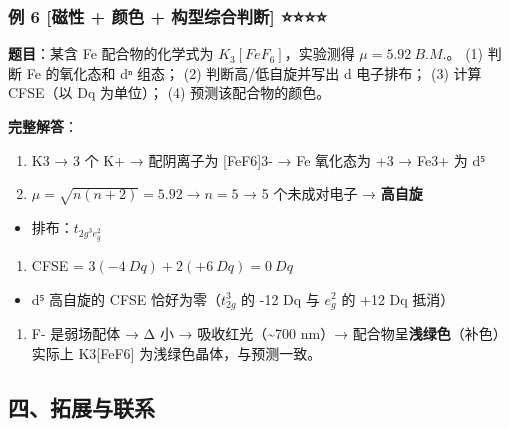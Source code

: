 \documentclass[a4paper,11pt]{ctexart}
\providecommand{\tightlist}{\setlength{\itemsep}{0pt}\setlength{\parskip}{0pt}}
\begin{document}
\subsubsection{例 6 {[}磁性 + 颜色 + 构型综合判断{]} ⭐⭐⭐⭐}\label{ux4f8b-6-ux78c1ux6027-ux989cux8272-ux6784ux578bux7efcux5408ux5224ux65ad}

\textbf{题目}：某含 Fe 配合物的化学式为 \(K_3[FeF_6]\)，实验测得 \(\mu = 5.92\ B.M.\)。
(1) 判断 Fe 的氧化态和 dⁿ 组态；
(2) 判断高/低自旋并写出 d 电子排布；
(3) 计算 CFSE（以 Dq 为单位）；
(4) 预测该配合物的颜色。

\textbf{完整解答}：

\begin{enumerate}
\def\labelenumi{(\arabic{enumi})}
\item
  K3 → 3 个 K+ → 配阴离子为 {[}FeF6{]}3- → Fe 氧化态为 +3 → Fe3+ 为 d⁵
\item
  \(\mu = \sqrt{n(n+2)} = 5.92 \rightarrow n = 5\) → 5 个未成对电子 → \textbf{高自旋}
\end{enumerate}

\begin{itemize}
\tightlist
\item
  排布：\(t_{2g^3 e_g^2}\)
\end{itemize}

\begin{enumerate}
\def\labelenumi{(\arabic{enumi})}
\setcounter{enumi}{2}
\tightlist
\item
  CFSE = \(3(-4\ Dq) + 2(+6\ Dq) = 0\ Dq\)
\end{enumerate}

\begin{itemize}
\tightlist
\item
  d⁵ 高自旋的 CFSE 恰好为零（\(t_{2g}^3\) 的 -12 Dq 与 \(e_g^2\) 的 +12 Dq 抵消）
\end{itemize}

\begin{enumerate}
\def\labelenumi{(\arabic{enumi})}
\setcounter{enumi}{3}
\tightlist
\item
  F- 是弱场配体 → Δ 小 → 吸收红光（\textasciitilde700 nm）→ 配合物呈\textbf{浅绿色}（补色）
  实际上 K3{[}FeF6{]} 为浅绿色晶体，与预测一致。
\end{enumerate}

\subsection{四、拓展与联系}\label{ux56dbux62d3ux5c55ux4e0eux8054ux7cfb}
\end{document}
